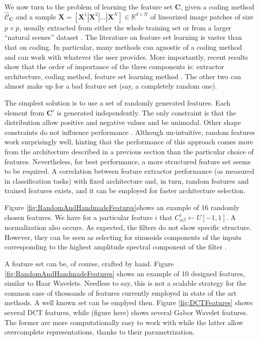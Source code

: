 \documentclass[12pt,a4paper,oneside,english]{UPBThesis}
\newcommand{\hctimes}[2]{{#1}\!\times\!{#2}}
\begin{document}
We now turn to the problem of learning the feature set $\textbf{C}$, given a coding method $\hat{\mathcal{C}}_\textbf{C}$ and a sample $\textbf{X} = \left[ \textbf{X}^1 \left|\right. \textbf{X}^2 \left|\right. \dots \left|\right. \textbf{X}^N \right] \in \mathbb{R}^{\hctimes{d}{N}}$ of linearized image patches of size $\hctimes{p}{p}$, usually extracted from either the whole training set or from a larger ``natural scenes'' dataset \cite{self-taught-learning}. The literature on feature set learning is vaster than that on coding. In particular, many methods can agnostic of a coding method and can work with whatever the user provides. More importantly, recent results show that the order of importance of the three components is: extractor architecture, coding method, feature set learning method \cite{importance-encoding-sparse-coding-vq,random-weights-feature-learning,beyond-simple-features}. The other two can almost make up for a bad feature set (say, a completely random one).

The simplest solution is to use a set of randomly generated features. Each element from $\textbf{C}^i$ is generated independently. The only constraint is that the distribution allow positive and negative values and be unimodal. Other shape constraints do not influence performance \cite{random-weights-feature-learning}. Although un-intuitive, random features work surprisingly well, hinting that the performance of this approach comes more from the architecture described in a previous section than the particular choice of features. Nevertheless, for best performance, a more structured feature set seems to be required. A correlation between feature extractor performance (as measured in classification tasks) with fixed architecture and, in turn, random features and trained features exists, and it can be employed for faster architecture selection.

Figure \ref{fig:RandomAndHandmadeFeatures}shows an example of 16 randomly chosen features. We have for a particular feature $i$ that $C^i_{\alpha\beta} \leftarrow U[-1,1]$. A normalization also occurs. As expected, the filters do not show specific structure. However, they can be seen as selecting for sinusoids components of the inputs corresponding to the highest amplitude spectral component of the filter \cite{random-weights-feature-learning}.

A feature set can be, of course, crafted by hand. Figure \ref{fig:RandomAndHandmadeFeatures} shows an example of 10 designed features, similar to Haar Wavelets. Needless to say, this is not a scalable strategy for the common case of thousands of features currently employed in state of the art methods. A well known set can be emplyed then. Figure \ref{fig:DCTFeatures} shows several DCT features, while (figure here) shows several Gabor Wavelet features. The former are more computationally easy to work with while the latter allow overcomplete representations, thanks to their parametrization.
\end{document}
